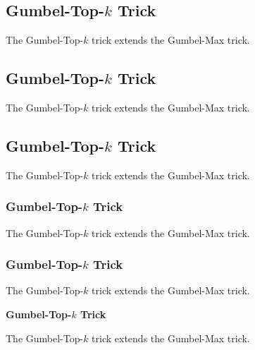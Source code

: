 \subsection{Gumbel-Top-\texorpdfstring{$k$}{k} Trick}
The Gumbel-Top-$k$ trick extends the Gumbel-Max trick.
\subsection{Gumbel-Top-\texorpdfstring{$k$}{k} Trick}
The Gumbel-Top-$k$ trick extends the Gumbel-Max trick.
\subsection{Gumbel-Top-\texorpdfstring{$k$}{k} Trick}
The Gumbel-Top-$k$ trick extends the Gumbel-Max trick.
\begin{frame}[t]
\frametitle{Gumbel-Top-\texorpdfstring{$k$}{k} Trick}
The Gumbel-Top-$k$ trick extends the Gumbel-Max trick.
\end{frame}

\begin{frame}[t]
\frametitle{Gumbel-Top-\texorpdfstring{$k$}{k} Trick}
The Gumbel-Top-$k$ trick extends the Gumbel-Max trick.
\end{frame}

\begin{frame}[t]
\par\medskip\noindent\textbf{Gumbel-Top-\texorpdfstring{$k$}{k} Trick}\par

The Gumbel-Top-$k$ trick extends the Gumbel-Max trick.
\end{frame}

